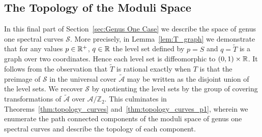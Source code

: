 \documentclass{article}
\begin{document}










\subsection{The Topology of the Moduli Space}
\label{subsec:Topology}

In this final part of Section~\ref{sec:Genus One Case} we describe the space of genus one spectral curves $\mathcal{S}$. 
More precisely,
in Lemma~\ref{lem:T_graph} we demonstrate that for any values $p \in \mathbb{R}^+$, $q\in\mathbb{R}$ the level set defined by $p = S$ and $q = \tilde{T}$ is a graph over two coordinates. 
Hence each level set is diffeomorphic to $(0,1)\times\mathbb{R}$.
It follows from the observation that $\tilde{T}$ is rational exactly when $T$ is that the preimage of $\mathcal{S}$ in the universal cover $\mathcal{\tilde{A}}$ may be written as the disjoint union of the level sets.
We recover $\mathcal{S}$ by quotienting the level sets by the group of covering transformations of $\mathcal{\tilde{A}}$ over $\mathcal{A}/\mathbb{Z}_2$. This culminates in Theorems~\ref{thm:topology_curves} and~\ref{thm:topology_curves_p1}, wherein we enumerate the path connected components of the moduli space of genus one spectral curves and describe the topology of each component.
\end{document}
